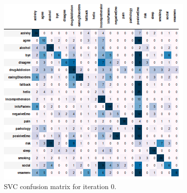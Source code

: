 \documentclass[11pt]{article}
\begin{document}
\begin{figure}[h]
	\centering
	\includegraphics[scale=0.7]{lsvc_0.png}
	\caption{SVC confusion matrix for iteration 0.}
\label{lsvc_cm_0}
\end{figure}
\FloatBarrier
\end{document}
